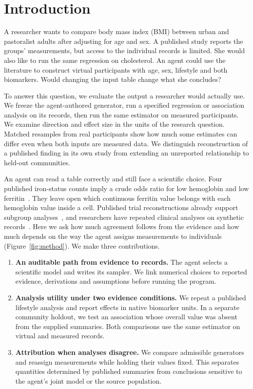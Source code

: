 \documentclass[sigconf,anonymous,review]{acmart}
\begin{document}
\section{Introduction}
A researcher wants to compare body mass index (BMI) between urban and pastoralist adults after adjusting for age and sex. A published study reports the groups' measurements, but access to the individual records is limited. She would also like to run the same regression on cholesterol. An agent could use the literature to construct virtual participants with age, sex, lifestyle and both biomarkers. Would changing the input table change what she concludes?

To answer this question, we evaluate the output a researcher would actually use. We freeze the agent-authored generator, run a specified regression or association analysis on its records, then run the same estimator on measured participants. We examine direction and effect size in the units of the research question. Matched resamples from real participants show how much some estimates can differ even when both inputs are measured data. We distinguish reconstruction of a published finding in its own study from extending an unreported relationship to held-out communities.

An agent can read a table correctly and still face a scientific choice. Four published iron-status counts imply a crude odds ratio for low hemoglobin and low ferritin~\cite{zhu}. They leave open which continuous ferritin value belongs with each hemoglobin value inside a cell. Published trial reconstructions already support subgroup analyses~\cite{synthipd}, and researchers have repeated clinical analyses on synthetic records~\cite{azizi}. Here we ask how much agreement follows from the evidence and how much depends on the way the agent assigns measurements to individuals (Figure~\ref{fig:method}). We make three contributions.
\begin{enumerate}
\item \textbf{An auditable path from evidence to records.} The agent selects a scientific model and writes its sampler. We link numerical choices to reported evidence, derivations and assumptions before running the program.
\item \textbf{Analysis utility under two evidence conditions.} We repeat a published lifestyle analysis and report effects in native biomarker units. In a separate community holdout, we test an association whose overall value was absent from the supplied summaries. Both comparisons use the same estimator on virtual and measured records.
\item \textbf{Attribution when analyses disagree.} We compare admissible generators and reassign measurements while holding their values fixed. This separates quantities determined by published summaries from conclusions sensitive to the agent's joint model or the source population.
\end{enumerate}
\end{document}
